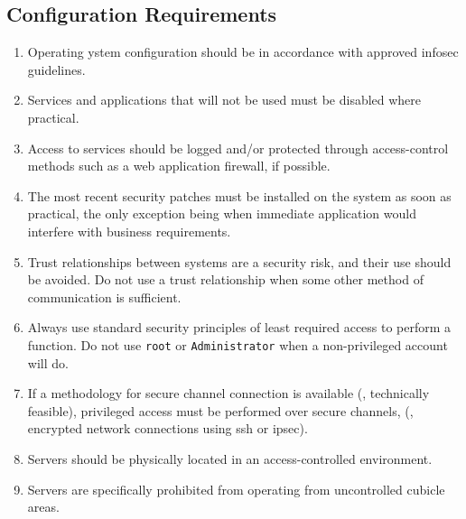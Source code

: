 \subsection{Configuration Requirements}
\begin{enumerate}
\item
Operating ystem configuration should be in accordance with approved \gls{infosec} guidelines. 
\item
Services and applications that will not be used must be disabled where practical.
\item
Access to services should be logged and/or protected through access-control methods such as a web application firewall, if possible. 
\item
The most recent security patches must be installed on the system as soon as practical, the only exception being when immediate application would interfere with business requirements. 
\item
Trust relationships between systems are a security risk, and their use should be avoided.  
Do not use a trust relationship when some other method of communication is sufficient. 
\item
Always use standard security principles of least required access to perform a function.  
Do not use \texttt{root} or \texttt{Administrator} when a non-privileged account will do. 
\item
If a methodology for secure channel connection is available (\ie, technically feasible), privileged access must be performed over secure channels, (\eg, encrypted network connections using \gls{ssh} or \gls{ipsec}). 
\item
Servers should be physically located in an access-controlled environment. 
\item
Servers are specifically prohibited from operating from uncontrolled cubicle areas. 
\end{enumerate}
